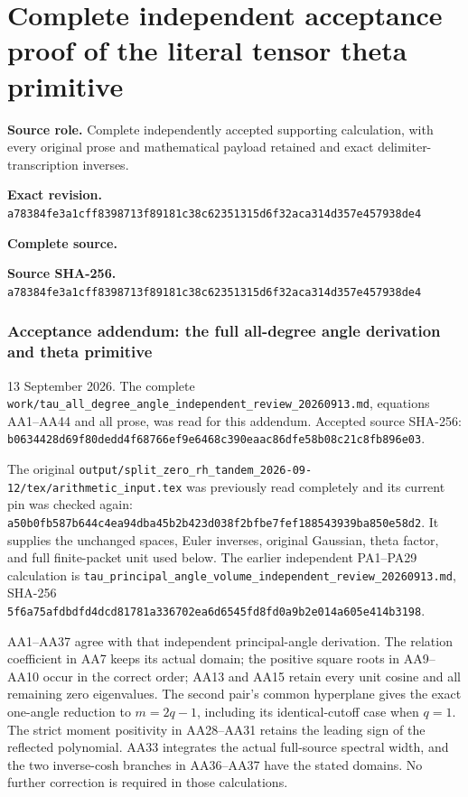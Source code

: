 \begingroup

\section{Complete independent acceptance proof of the literal tensor theta primitive}


\begingroup
\sloppy
\small

\noindent\textbf{Source role.} Complete independently accepted supporting calculation, with every original prose and mathematical payload retained and exact delimiter-transcription inverses.\par
\noindent\textbf{Exact revision.} \nolinkurl{a78384fe3a1cff8398713f89181c38c62351315d6f32aca314d357e457938de4}\par
\noindent\textbf{Complete source.} \par
\noindent\textbf{Source SHA-256.} \nolinkurl{a78384fe3a1cff8398713f89181c38c62351315d6f32aca314d357e457938de4}\par\medskip
\subsubsection{Acceptance addendum: the full all-degree angle derivation and theta primitive}\label{endpoint-angle_primitive_acceptance--acceptance-addendum-the-full-all-degree-angle-derivation-and-theta-primitive}

13 September 2026. The complete \nolinkurl{work/tau_all_degree_angle_independent_review_20260913.md}, equations AA1--AA44 and all prose, was read for this addendum. Accepted source SHA-256: \nolinkurl{b0634428d69f80dedd4f68766ef9e6468c390eaac86dfe58b08c21c8fb896e03}.

The original \nolinkurl{output/split_zero_rh_tandem_2026-09-12/tex/arithmetic_input.tex} was previously read completely and its current pin was checked again: \nolinkurl{a50b0fb587b644c4ea94dba45b2b423d038f2bfbe7fef188543939ba850e58d2}. It supplies the unchanged spaces, Euler inverses, original Gaussian, theta factor, and full finite-packet unit used below. The earlier independent PA1--PA29 calculation is \nolinkurl{tau_principal_angle_volume_independent_review_20260913.md}, SHA-256 \nolinkurl{5f6a75afdbdfd4dcd81781a336702ea6d6545fd8fd0a9b2e014a605e414b3198}.

AA1--AA37 agree with that independent principal-angle derivation. The relation coefficient in AA7 keeps its actual domain; the positive square roots in AA9--AA10 occur in the correct order; AA13 and AA15 retain every unit cosine and all remaining zero eigenvalues. The second pair's common hyperplane gives the exact one-angle reduction to \(m=2q-1\), including its identical-cutoff case when \(q=1\). The strict moment positivity in AA28--AA31 retains the leading sign of the reflected polynomial. AA33 integrates the actual full-source spectral width, and the two inverse-cosh branches in AA36--AA37 have the stated domains. No further correction is required in those calculations.

